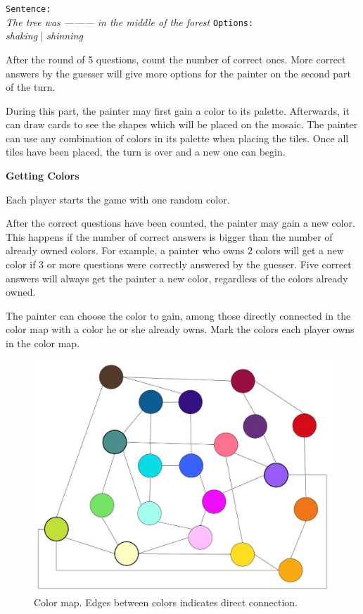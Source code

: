 \documentclass{article}
\newcommand{\lvl}[1]{\vspace{0.5cm}\Large{\textbf{#1}}\vspace{0.2cm}}
\begin{document}
\begin{centering}
\texttt{Sentence:}\\
\textit{The tree was --------- in the middle of the forest}
\texttt{Options:}\\
\textit{shaking} | \textit{shinning}\\
\end{centering}
\vspace{0.5cm}

After the round of 5 questions, count the number of correct ones.
More correct answers by the guesser will give more options for the painter on the second part of the turn. 

During this part, the painter may first gain a color to its palette. Afterwards, it can draw cards to see the shapes which will be placed on the mosaic. The painter can use any combination of colors in its palette when placing the tiles. Once all tiles have been placed, the turn is over and a new one can begin.


\lvl{Getting Colors}

Each player starts the game with one random color.

After the correct questions have been counted, the painter may gain a new color. This happens if the number of correct answers is bigger than the number of already owned colors. For example, a painter who owns 2 colors will get a new color if 3 or more questions were correctly answered by the guesser. Five correct answers will always get the painter a new color, regardless of the colors already owned.

The painter can choose the color to gain, among those directly connected in the color map with a color he or she already owns. Mark the colors each player owns in the color map.

\begin{figure}[h!]
\centering
\includegraphics[scale=0.25]{color_map.jpg}
\caption{Color map. Edges between colors indicates direct connection.}
\label{fig:color_map}
\end{figure}
\end{document}
